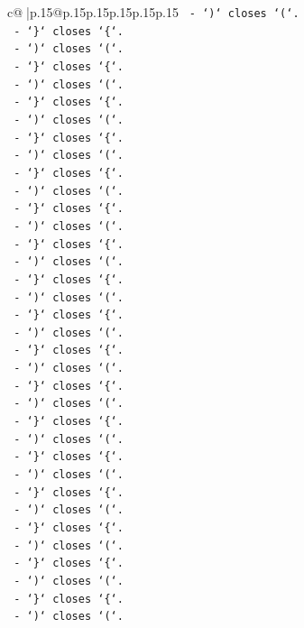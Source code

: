 \documentclass{article}
\begin{document}
{\begin{supertabular}{c@{$\;$}|p{.15\linewidth}@{}p{.15\linewidth}p{.15\linewidth}p{.15\linewidth}p{.15\linewidth}p{.15\linewidth}}
{{{\texttt{   {-} `)` closes `(`.} \\
\texttt{   {-} `\}` closes `\{`.} \\
\texttt{   {-} `)` closes `(`.} \\
\texttt{   {-} `\}` closes `\{`.} \\
\texttt{   {-} `)` closes `(`.} \\
\texttt{   {-} `\}` closes `\{`.} \\
\texttt{   {-} `)` closes `(`.} \\
\texttt{   {-} `\}` closes `\{`.} \\
\texttt{   {-} `)` closes `(`.} \\
\texttt{   {-} `\}` closes `\{`.} \\
\texttt{   {-} `)` closes `(`.} \\
\texttt{   {-} `\}` closes `\{`.} \\
\texttt{   {-} `)` closes `(`.} \\
\texttt{   {-} `\}` closes `\{`.} \\
\texttt{   {-} `)` closes `(`.} \\
\texttt{   {-} `\}` closes `\{`.} \\
\texttt{   {-} `)` closes `(`.} \\
\texttt{   {-} `\}` closes `\{`.} \\
\texttt{   {-} `)` closes `(`.} \\
\texttt{   {-} `\}` closes `\{`.} \\
\texttt{   {-} `)` closes `(`.} \\
\texttt{   {-} `\}` closes `\{`.} \\
\texttt{   {-} `)` closes `(`.} \\
\texttt{   {-} `\}` closes `\{`.} \\
\texttt{   {-} `)` closes `(`.} \\
\texttt{   {-} `\}` closes `\{`.} \\
\texttt{   {-} `)` closes `(`.} \\
\texttt{   {-} `\}` closes `\{`.} \\
\texttt{   {-} `)` closes `(`.} \\
\texttt{   {-} `\}` closes `\{`.} \\
\texttt{   {-} `)` closes `(`.} \\
\texttt{   {-} `\}` closes `\{`.} \\
\texttt{   {-} `)` closes `(`.} \\
\texttt{   {-} `\}` closes `\{`.} \\
\texttt{   {-} `)` closes `(`.} \\
}}}
\end{supertabular}}
\end{document}
